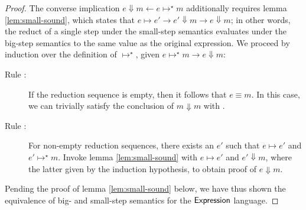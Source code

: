 \begin{proof}
\noindent The converse implication $e \Downarrow m \leftarrow
e \mapsto^\star m$ additionally requires lemma \ref{lem:small-sound},
which states that $e \mapsto e' \rightarrow e' \Downarrow m \rightarrow
e \Downarrow m$; in other words, the reduct of a single step under the
small-step semantics evaluates under the big-step semantics to the same
value as the original expression. We proceed by induction over the
definition of $\mapsto^\star$, given $e \mapsto^\star m \rightarrow
e \Downarrow m$:
\begin{description}
\item[Rule :]%
If the reduction sequence is empty, then it follows that $e \equiv m$. In
this case, we can trivially satisfy the conclusion of $m \Downarrow m$ with
.
\item[Rule :]%
For non-empty reduction sequences, there exists an $e'$ such that $e \mapsto
e'$ and $e' \mapsto^\star m$. Invoke lemma \ref{lem:small-sound} with $e
\mapsto e'$ and $e' \Downarrow m$, where the latter given by the induction
hypothesis, to obtain proof of $e \Downarrow m$.
\end{description}
Pending the proof of lemma \ref{lem:small-sound} below, we have thus shown
the equivalence of big- and small-step semantics for the $\mathsf{Expression}$
language.
\end{proof}

